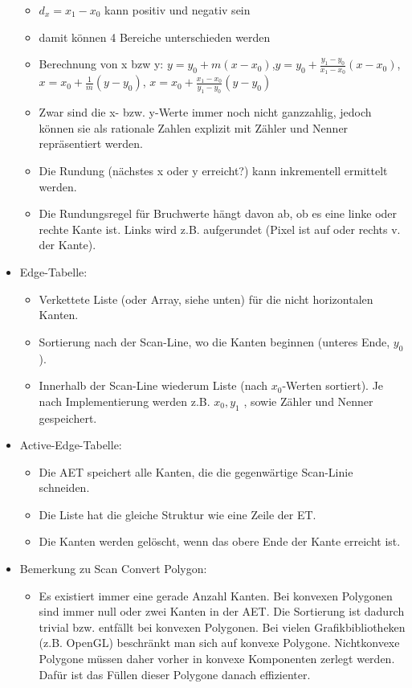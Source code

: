 \documentclass[10pt,landscape]{article}
\begin{document}
\begin{multicols}{3}
\begin{itemize}
\begin{itemize}
          \item $d_x = x_1 - x_0$ kann positiv und negativ sein
          \item damit können 4 Bereiche unterschieden werden
          \item Berechnung von x bzw y: $y=y_0+m(x-x_0)$,$y=y_0+\frac{y_1-y_0}{x_1-x_0}(x-x_0)$,$x=x_0+\frac{1}{m}(y-y_0)$, $x=x_0+\frac{x_1-x_0}{y_1-y_0}(y-y_0)$
          \item Zwar sind die x- bzw. y-Werte immer noch nicht ganzzahlig, jedoch können sie als rationale Zahlen explizit mit Zähler und Nenner repräsentiert werden.
          \item Die Rundung (nächstes x oder y erreicht?) kann inkrementell ermittelt werden.
          \item Die Rundungsregel für Bruchwerte hängt davon ab, ob es eine linke oder rechte Kante ist. Links wird z.B. aufgerundet (Pixel ist auf oder rechts v. der Kante).
        \end{itemize}
  \item Edge-Tabelle:
        \begin{itemize}
          \item  Verkettete Liste (oder Array, siehe unten) für die nicht horizontalen Kanten.
          \item  Sortierung nach der Scan-Line, wo die Kanten beginnen (unteres Ende, $y_0$ ).
          \item  Innerhalb der Scan-Line wiederum Liste (nach $x_0$-Werten sortiert). Je nach Implementierung werden z.B. $x_0 , y_1$ , sowie Zähler und Nenner gespeichert.
        \end{itemize}
  \item Active-Edge-Tabelle:
        \begin{itemize}
          \item  Die AET speichert alle Kanten, die die gegenwärtige Scan-Linie schneiden.
          \item  Die Liste hat die gleiche Struktur wie eine Zeile der ET.
          \item  Die Kanten werden gelöscht, wenn das obere Ende der Kante erreicht ist.
        \end{itemize}
  \item Bemerkung zu Scan Convert Polygon:
        \begin{itemize}
          \item Es existiert immer eine gerade Anzahl Kanten. Bei konvexen Polygonen sind immer null oder zwei Kanten in der AET. Die Sortierung ist dadurch trivial bzw. entfällt bei konvexen Polygonen. Bei vielen Grafikbibliotheken (z.B. OpenGL) beschränkt man sich auf konvexe Polygone. Nichtkonvexe Polygone müssen daher vorher in konvexe Komponenten zerlegt werden. Dafür ist das Füllen dieser Polygone danach effizienter.

\end{itemize}
\end{itemize}
\end{multicols}
\end{document}
